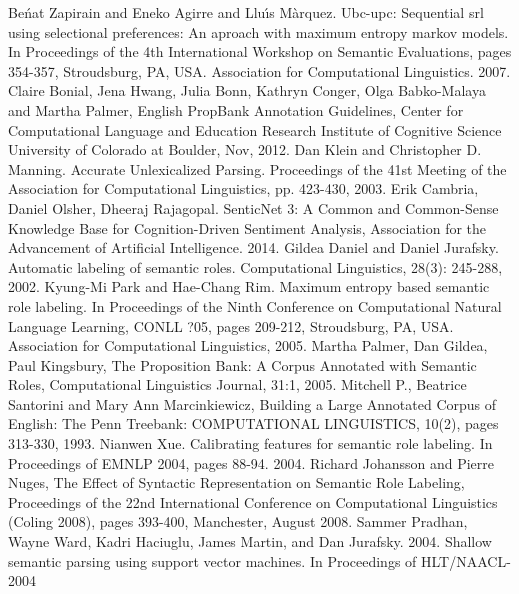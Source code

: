 \documentclass[runningheads,a4paper]{llncs}
\begin{document}
\begin{thebibliography}{4}
 Be\'{n}at Zapirain and Eneko Agirre and Llu\'{\i}s M\`{a}rquez. Ubc-upc: Sequential srl using selectional preferences: An aproach with maximum entropy markov models. In Proceedings of the 4th International Workshop on Semantic Evaluations, pages 354-357, Stroudsburg, PA, USA. Association for Computational Linguistics. 2007.
 Claire Bonial, Jena Hwang, Julia Bonn, Kathryn Conger, Olga Babko-Malaya and Martha Palmer, English PropBank Annotation Guidelines, Center for Computational Language and Education Research Institute of Cognitive Science University of Colorado at Boulder, Nov, 2012.
 Dan Klein and Christopher D. Manning. Accurate Unlexicalized Parsing. Proceedings of the 41st Meeting of the Association for Computational Linguistics, pp. 423-430, 2003.
 Erik Cambria, Daniel Olsher, Dheeraj Rajagopal. SenticNet 3: A Common and Common-Sense Knowledge Base for Cognition-Driven Sentiment Analysis, Association for the Advancement of Artificial Intelligence. 2014. 
 Gildea Daniel and Daniel Jurafsky. Automatic labeling of semantic roles. Computational Linguistics, 28(3): 245-288, 2002.
 Kyung-Mi Park and Hae-Chang Rim. Maximum entropy based semantic role labeling. In Proceedings of the Ninth Conference on Computational Natural Language Learning, CONLL ?05, pages 209-212, Stroudsburg, PA, USA. Association for Computational Linguistics, 2005.
 Martha Palmer, Dan Gildea, Paul Kingsbury, The Proposition Bank: A Corpus Annotated with Semantic Roles, Computational Linguistics Journal, 31:1, 2005.
 Mitchell P., Beatrice Santorini and Mary Ann Marcinkiewicz, Building a Large Annotated Corpus of English: The Penn Treebank: COMPUTATIONAL LINGUISTICS, 10(2), pages 313-330, 1993.
 Nianwen Xue. Calibrating features for semantic role labeling. In Proceedings of EMNLP 2004, pages 88-94. 2004.
 Richard Johansson and Pierre Nuges, The Effect of Syntactic Representation on Semantic Role Labeling, Proceedings of the 22nd International Conference on Computational Linguistics (Coling 2008), pages 393-400, Manchester, August 2008.
 Sammer Pradhan, Wayne Ward, Kadri Haciuglu, James Martin, and Dan Jurafsky. 2004. Shallow semantic parsing using support vector machines. In Proceedings of HLT/NAACL-2004


\end{thebibliography}
\end{document}
